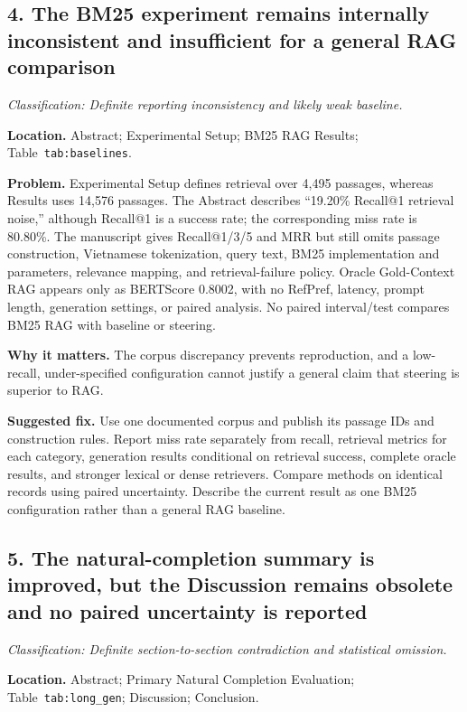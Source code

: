 \documentclass[11pt]{article}
\newcommand{\findinglabel}[1]{\textbf{#1}}
\newcommand{\classification}[1]{\textit{Classification: #1.}}
\begin{document}
\subsection*{4. The BM25 experiment remains internally inconsistent and insufficient for a general RAG comparison}

\classification{Definite reporting inconsistency and likely weak baseline}

\findinglabel{Location.} Abstract; Experimental Setup; BM25 RAG Results; Table~\texttt{tab:baselines}.

\findinglabel{Problem.} Experimental Setup defines retrieval over 4,495 passages, whereas Results uses 14,576 passages.  The Abstract describes ``19.20\% Recall@1 retrieval noise,'' although Recall@1 is a success rate; the corresponding miss rate is 80.80\%.  The manuscript gives Recall@1/3/5 and MRR but still omits passage construction, Vietnamese tokenization, query text, BM25 implementation and parameters, relevance mapping, and retrieval-failure policy.  Oracle Gold-Context RAG appears only as BERTScore 0.8002, with no RefPref, latency, prompt length, generation settings, or paired analysis.  No paired interval/test compares BM25 RAG with baseline or steering.

\findinglabel{Why it matters.} The corpus discrepancy prevents reproduction, and a low-recall, under-specified configuration cannot justify a general claim that steering is superior to RAG.

\findinglabel{Suggested fix.} Use one documented corpus and publish its passage IDs and construction rules.  Report miss rate separately from recall, retrieval metrics for each category, generation results conditional on retrieval success, complete oracle results, and stronger lexical or dense retrievers.  Compare methods on identical records using paired uncertainty.  Describe the current result as one BM25 configuration rather than a general RAG baseline.

\subsection*{5. The natural-completion summary is improved, but the Discussion remains obsolete and no paired uncertainty is reported}

\classification{Definite section-to-section contradiction and statistical omission}

\findinglabel{Location.} Abstract; Primary Natural Completion Evaluation; Table~\texttt{tab:long\_gen}; Discussion; Conclusion.
\end{document}
